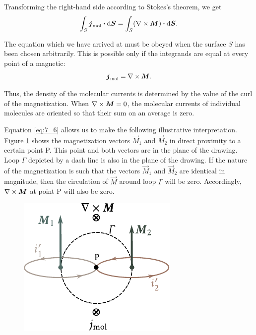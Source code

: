 \noindent
Transforming the right-hand side according to Stokes's theorem, we get
\begin{equation*}
    \int_S \boldsymbol{j}_{\text{mol}} \boldsymbol{\cdot} \mathrm{d}\boldsymbol{S} = \int_S (\nabla\times\boldsymbol{M}) \boldsymbol{\cdot} \mathrm{d}\boldsymbol{S}.
\end{equation*}

\noindent
The equation which we have arrived at must be obeyed when the surface $S$ has been chosen arbitrarily.
This is possible only if the integrands are equal at every point of a magnetic:
\begin{equation}\label{eq:7_6}
    \boldsymbol{j}_{\text{mol}} = \nabla\times\boldsymbol{M}.
\end{equation}

\noindent
Thus, the density of the molecular currents is determined by the value of the curl of the magnetization.
When $\nabla\times\boldsymbol{M}=0$, the molecular currents of individual molecules are oriented so that their sum on an average is zero.

Equation \eqref{eq:7_6} allows us to make the following illustrative interpretation.
Figure \ref{fig:7_3} shows the magnetization vectors $\vec{M}_1$ and $\vec{M}_2$ in direct proximity to a certain point P. This point and both vectors are in the plane of the drawing.
Loop $\Gamma$ depicted by a dash line is also in the plane of the drawing.
If the nature of the magnetization is such that the vectors $\vec{M}_1$ and $\vec{M}_2$ are identical in magnitude, then the circulation of $\vec{M}$ around loop $\Gamma$ will be zero.
Accordingly, $\nabla\times\boldsymbol{M}$ at point P will also be zero.

\begin{figure}[t]
	\begin{center}
		\includegraphics[scale=1]{figures/ch_07/fig_7_3.pdf}
		\caption[]{}
		\label{fig:7_3}
	\end{center}
	\vspace{-0.8cm}
\end{figure}

